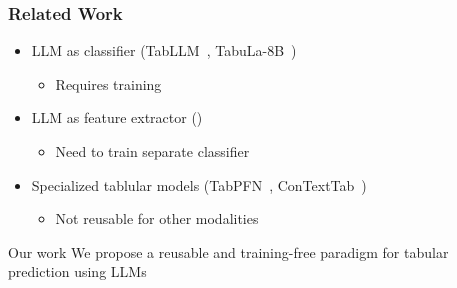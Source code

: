 \documentclass[
	10pt, %
	aspectratio=169, %
]{beamer}
\begin{document}
\begin{frame}
	\frametitle{Related Work}
	\begin{itemize}
  \item LLM as classifier (TabLLM~\cite{hegselmannTabLLMFewshotClassification2023}, TabuLa-8B~\cite{gardnerLargeScaleTransfer2024}) 
		      \begin{itemize}
			      \item Requires training
		      \end{itemize}
		\item LLM as feature extractor ()
		      \begin{itemize}
			      \item Need to train separate classifier
		      \end{itemize}
        \item Specialized tablular models (TabPFN~\cite{hollmannAccuratePredictionsSmall2025}, ConTextTab~\cite{spinaciConTextTabSemanticsAwareTabular2025})
		      \begin{itemize}
			      \item Not reusable for other modalities
		      \end{itemize}
	\end{itemize}
  \vfill
  \begin{secondaryblock}{Our work}
    We propose a reusable and training-free paradigm for tabular prediction using LLMs
  \end{secondaryblock}
\end{frame}
\end{document}
